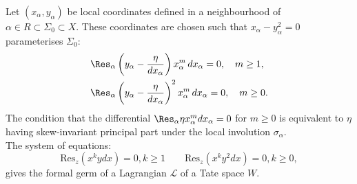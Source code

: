     Let $(x_\alpha,y_\alpha)$ be local coordinates defined in a neighbourhood of $\alpha\in R\subset\Sigma_0\subset X$.
    These coordinates are chosen such that $x_\alpha-y_\alpha^2=0$ parameterises $\Sigma_0$:
    \begin{align}
    &\Res_{\alpha} \left(y_{\alpha}-\frac{\eta}{dx_{\alpha}}\right)x_{\alpha}^m \, dx_{\alpha} =0,  \quad m\geq 1,  \\
    &\Res_{\alpha} \left(y_{\alpha}-\frac{\eta}{dx_{\alpha}}\right)^2 x_{\alpha}^m\, dx_{\alpha}=0,  \quad m\geq 0. 
    \end{align} 
    The condition that the differential $\Res_\alpha\eta x_\alpha^mdx_\alpha=0$ for $m\geq 0$ is equivalent to $\eta$ having skew-invariant principal part under the local involution $\sigma_\alpha$.\\



    The system of equations:
    \[\mathrm{Res}_z(x^k ydx)=0, k \geq 1 \qquad \mathrm{Res}_z(x^k y^2 dx)=0, k \geq 0,\]
    gives the formal germ of a Lagrangian \(\mathcal{L}\) of a Tate space $W$.
